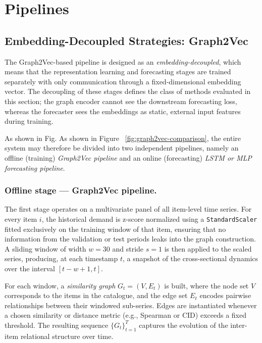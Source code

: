 \chapter{Pipelines}

\section{Embedding-Decoupled Strategies: Graph2Vec}

The Graph2Vec-based pipeline is designed as an \emph{embedding-decoupled}, which means that the representation learning and forecasting stages are trained separately with only communication through a fixed-dimensional embedding vector. The decoupling of these stages defines the class of methods evaluated in this section; the graph encoder cannot see the downstream forecasting loss, whereas the forecaster sees the embeddings as static, external input features during training.

As shown in Fig. As shown in Figure ~\ref{fig:graph2vec-comparison}, the entire system may therefore be divided into two independent pipelines, namely an offline (training) \emph{Graph2Vec pipeline} and an online (forecasting) \emph{LSTM or MLP forecasting pipeline}.

\subsection{Offline stage --- Graph2Vec pipeline.}
The first stage operates on a multivariate panel of all item-level time series. For every item \(i\), the historical demand is z-score normalized using a \texttt{StandardScaler} fitted exclusively on the training window of that item, ensuring that no information from the validation or test periods leaks into the graph construction. A sliding window of width \(w=30\) and stride \(s=1\) is then applied to the scaled series, producing, at each timestamp \(t\), a snapshot of the cross-sectional dynamics over the interval \([t-w+1,t]\).

For each window, a \emph{similarity graph} \(G_t=(V,E_t)\) is built, where the node set \(V\) corresponds to the items in the catalogue, and the edge set \(E_t\) encodes pairwise relationships between their windowed sub-series. Edges are instantiated whenever a chosen similarity or distance metric (e.g., Spearman or CID) exceeds a fixed threshold. The resulting sequence \(\{G_t\}_{t=1}^{T}\) captures the evolution of the inter-item relational structure over time.

